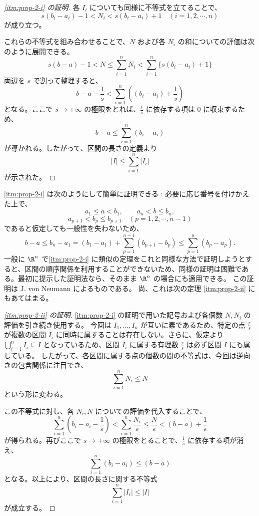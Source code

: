 \documentclass[article,paper=a4paper]{jlreq}
\begin{document}
\begin{proof}[\ref{itm:prop-2-i} の証明]
各 $I_i$ についても同様に不等式を立てることで、
\[
 s(b_i - a_i) - 1 < N_i < s(b_i - a_i) + 1 \quad (i=1,2,\cdots,n)
\]
が成り立つ。

これらの不等式を組み合わせることで、$N$ および各 $N_i$ の和についての評価は次のように展開できる。
\[
 s(b-a) - 1 < N \leq \sum_{i=1}^{n} N_i < \sum_{i=1}^{n} \{s(b_i - a_i) + 1\}
\]
両辺を $s$ で割って整理すると、
\[
 b - a - \frac{1}{s} < \sum_{i=1}^{n} \left( (b_i - a_i) + \frac{1}{s} \right)
\]
となる。ここで $s \to +\infty$ の極限をとれば、$\frac{1}{s}$ に依存する項は $0$ に収束するため、
\[
 b - a \leq \sum_{i=1}^{n} (b_i - a_i)
\]
が導かれる。したがって、区間の長さの定義より
\[
 |I| \leq \sum_{i=1}^{n} |I_i|
\]
が示された。
\end{proof}

\begin{rem}
\ref{itm:prop-2-i} は次のようにして簡単に証明できる : 
必要に応じ番号を付けかえた上で、
\[
 a_1\leq a<b_1,\qquad
 a_n<b\leq b_n,
\]
\[
 a_{p+1}<b_p\leq b_{p+1}
 \quad (p=1,2,\cdots,n-1)
\]
であると仮定しても一般性を失わないため、
\[
 b-a
 \leq b_n-a_1
 =
 (b_1-a_1)+\sum_{p=1}^{n-1}(b_{p+1}-b_p)
 \leq
 \sum_{p=1}^{n}(b_p-a_p).
\]
一般に $\R^n$ で\ref{itm:prop-2-i} に類似の定理をこれと同様な方法で証明しようとすると、区間の順序関係を利用することができないため、同様の証明は困難である。最初に提示した証明法なら、そのまま $\R^n$ の場合にも適用できる。
この証明は J. von Neumann によるものである。
尚、これは次の定理 \ref{itm:prop-2-ii} にもあてはまる。
\end{rem}

\begin{proof}[\ref{itm:prop-2-ii} の証明]
\ref{itm:prop-2-i} の証明で用いた記号および各個数 $N, N_i$ の評価を引き続き使用する。
今回は $I_1, \ldots, I_n$ が互いに素であるため、特定の点 $\frac{r}{s}$ が複数の区間 $I_i$ に同時に属することは存在しない。さらに、仮定より $\bigcup_{i=1}^{n} I_i \subseteq I$ となっているため、区間 $I_i$ に属する有理数 $\frac{r}{s}$ は必ず区間 $I$ にも属している。
したがって、各区間に属する点の個数の間の不等式は、今回は逆向きの包含関係に注目でき、
\[
 \sum_{i=1}^{n} N_i \leq N
\]
という形に変わる。

この不等式に対し、各 $N_i, N$ についての評価を代入することで、
\[
 \sum_{i=1}^{n} \left( b_i - a_i - \frac{1}{s} \right) < \sum_{i=1}^{n} \frac{N_i}{s} \leq \frac{N}{s} < (b-a) + \frac{1}{s}
\]
が得られる。再びここで $s \to +\infty$ の極限をとることで、$\frac{1}{s}$ に依存する項が消え、
\[
 \sum_{i=1}^{n} (b_i - a_i) \leq (b - a)
\]
となる。以上により、区間の長さに関する不等式
\[
 \sum_{i=1}^{n} |I_i| \leq |I|
\]
が成立する。
\end{proof}
\end{document}
